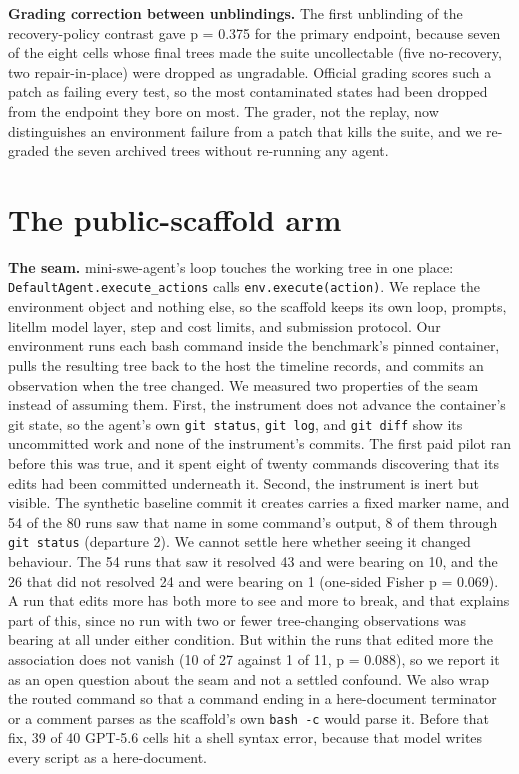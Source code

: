 \documentclass{article}
\begin{document}
\textbf{Grading correction between unblindings.} The first unblinding of the recovery-policy contrast gave p = 0.375 for the primary endpoint, because seven of the eight cells whose final trees made the suite uncollectable (five no-recovery, two repair-in-place) were dropped as ungradable. Official grading scores such a patch as failing every test, so the most contaminated states had been dropped from the endpoint they bore on most. The grader, not the replay, now distinguishes an environment failure from a patch that kills the suite, and we re-graded the seven archived trees without re-running any agent.

\section{The public-scaffold arm}

\textbf{The seam.} mini-swe-agent's loop touches the working tree in one place: \texttt{DefaultAgent.execute\_actions} calls \texttt{env.execute(action)}. We replace the environment object and nothing else, so the scaffold keeps its own loop, prompts, litellm model layer, step and cost limits, and submission protocol. Our environment runs each bash command inside the benchmark's pinned container, pulls the resulting tree back to the host the timeline records, and commits an observation when the tree changed. We measured two properties of the seam instead of assuming them. First, the instrument does not advance the container's git state, so the agent's own \texttt{git status}, \texttt{git log}, and \texttt{git diff} show its uncommitted work and none of the instrument's commits. The first paid pilot ran before this was true, and it spent eight of twenty commands discovering that its edits had been committed underneath it. Second, the instrument is inert but visible. The synthetic baseline commit it creates carries a fixed marker name, and 54 of the 80 runs saw that name in some command's output, 8 of them through \texttt{git status} (departure 2). We cannot settle here whether seeing it changed behaviour. The 54 runs that saw it resolved 43 and were bearing on 10, and the 26 that did not resolved 24 and were bearing on 1 (one-sided Fisher p = 0.069). A run that edits more has both more to see and more to break, and that explains part of this, since no run with two or fewer tree-changing observations was bearing at all under either condition. But within the runs that edited more the association does not vanish (10 of 27 against 1 of 11, p = 0.088), so we report it as an open question about the seam and not a settled confound. We also wrap the routed command so that a command ending in a here-document terminator or a comment parses as the scaffold's own \texttt{bash -c} would parse it. Before that fix, 39 of 40 GPT-5.6 cells hit a shell syntax error, because that model writes every script as a here-document.
\end{document}
